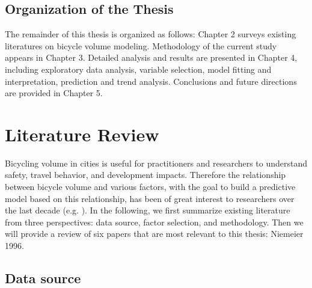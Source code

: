 \documentclass [11pt, proquest] {uwthesis}[2015/03/03]
\begin{document}
\begin{enumerate}
\end{enumerate}
 
\section{Organization of the Thesis}
The remainder of this thesis is organized as follows: Chapter 2 surveys existing literatures on bicycle volume modeling. Methodology of the current study appears in Chapter 3. Detailed analysis and results are presented in Chapter 4, including exploratory data analysis, variable selection, model fitting and interpretation, prediction and trend analysis. Conclusions and future directions are provided in Chapter 5.
 
 
\chapter{Literature Review}

Bicycling volume in cities is useful for practitioners and researchers to understand safety, travel behavior, and development impacts. Therefore the relationship between bicycle volume and various factors, with the goal to build a predictive model based on this relationship, has been of great interest to researchers over the last decade (e.g. \cite{Griswold:2011aa,Fields:2012aa,Niemeier:1996aa,Nosal:2014aa}). In the following, we first summarize existing literature from three perspectives: data source, factor selection, and methodology. Then we will provide a review of six papers that are most relevant to this thesis: Niemeier 1996.



\section{Data source}
\end{document}
